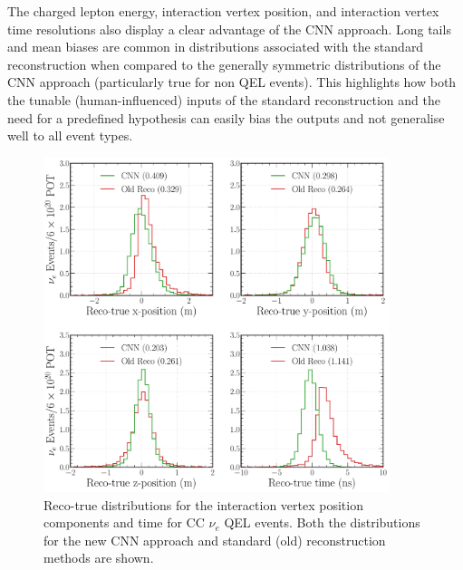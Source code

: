 The charged lepton energy, interaction vertex position, and interaction vertex time resolutions
also display a clear advantage of the CNN approach. Long tails and mean biases are common in
distributions associated with the standard reconstruction when compared to the generally symmetric
distributions of the CNN approach (particularly true for non QEL events). This highlights how both
the tunable (human-influenced) inputs of the standard reconstruction and the need for a predefined
hypothesis can easily bias the outputs and not generalise well to all event types.

\begin{figure} %
    \includegraphics[width=0.9\textwidth]{diagrams/7-results/final_vertex_nuel_res_comparison.pdf}
    \caption[Reco-true distributions for the interaction vertex parameters for CC $\nu_{e}$ QEL
        events] {Reco-true distributions for the interaction vertex position components and time
        for CC $\nu_{e}$ QEL events. Both the distributions for the new CNN approach and standard
        (old) reconstruction methods are shown.}
    \label{fig:final_vertex_nuel_res_comparison}
\end{figure}

